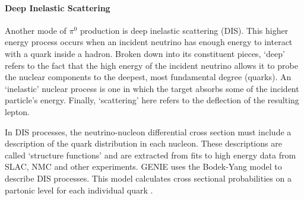 


\paragraph{Deep Inelastic Scattering} Another mode of $\pi^0$ production is deep inelastic scattering (DIS). This higher energy process occurs when an incident neutrino has enough energy to interact with a quark inside a hadron. Broken down into its constituent pieces, `deep' refers to the fact that the high energy of the incident neutrino allows it to probe the nuclear components to the deepest, most fundamental degree (quarks). An `inelastic' nuclear process is one in which the target absorbs some of the incident particle's energy. Finally, `scattering' here refers to the deflection of the resulting lepton. 
\par In DIS processes, the neutrino-nucleon differential cross section must include a description of the quark distribution in each nucleon.  These descriptions are called `structure functions' and are extracted from fits to high energy data from SLAC, NMC and other experiments. GENIE uses the Bodek-Yang model to describe DIS processes.  This model calculates cross sectional probabilities on a partonic level for each individual quark \cite{bib:bodek_yang0}.  

